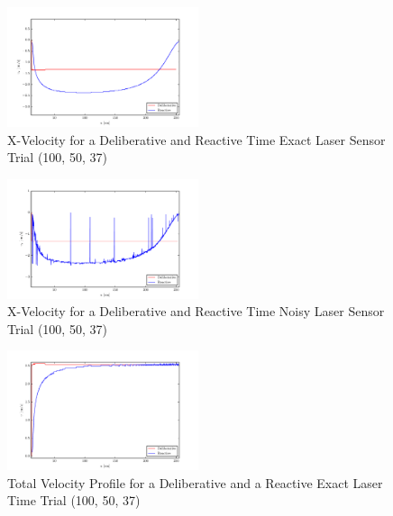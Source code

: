 \documentclass[journal, 10pt]{IEEEtran}
\begin{document}
\begin{figure}[tb]
\begin{center}
\includegraphics[width=0.5\textwidth]{figures/xVelocityClean.pdf}
\caption{X-Velocity for a Deliberative and Reactive Time Exact Laser Sensor Trial (100, 50, 37)}
\label{xClean_velocity}
\end{center}
\end{figure}

\begin{figure}[tb]
\begin{center}
\includegraphics[width=0.5\textwidth]{figures/xVelocityNoisy.pdf}
\caption{X-Velocity for a Deliberative and Reactive Time Noisy Laser Sensor Trial (100, 50, 37)}
\label{xNoise_velocity}
\end{center}
\end{figure}

\begin{figure}[tb]
\begin{center}
\includegraphics[width=0.5\textwidth]{figures/TotalVelocityClean.pdf}
\caption{Total Velocity Profile for a Deliberative and a Reactive Exact Laser Time Trial (100, 50, 37)}
\label{clean_total}
\end{center}
\end{figure}
\end{document}
